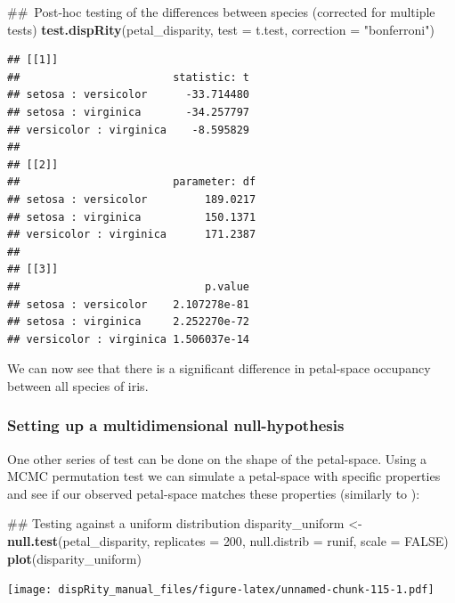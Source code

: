 \documentclass[]{book}
\newenvironment{Shaded}{\begin{snugshade}}{\end{snugshade}}
\newcommand{\KeywordTok}[1]{\textcolor[rgb]{0.13,0.29,0.53}{\textbf{#1}}}
\newcommand{\DataTypeTok}[1]{\textcolor[rgb]{0.13,0.29,0.53}{#1}}
\newcommand{\DecValTok}[1]{\textcolor[rgb]{0.00,0.00,0.81}{#1}}
\newcommand{\StringTok}[1]{\textcolor[rgb]{0.31,0.60,0.02}{#1}}
\newcommand{\OtherTok}[1]{\textcolor[rgb]{0.56,0.35,0.01}{#1}}
\newcommand{\NormalTok}[1]{#1}
\theoremstyle{definition}
\theoremstyle{definition}
\theoremstyle{remark}
\begin{document}
\begin{Shaded}
\begin{Highlighting}[]
\NormalTok{## Post-hoc testing of the differences between species (corrected for multiple tests)}
\KeywordTok{test.dispRity}\NormalTok{(petal_disparity, }\DataTypeTok{test =}\NormalTok{ t.test, }\DataTypeTok{correction =} \StringTok{"bonferroni"}\NormalTok{)}
\end{Highlighting}
\end{Shaded}

\begin{verbatim}
## [[1]]
##                        statistic: t
## setosa : versicolor      -33.714480
## setosa : virginica       -34.257797
## versicolor : virginica    -8.595829
## 
## [[2]]
##                        parameter: df
## setosa : versicolor         189.0217
## setosa : virginica          150.1371
## versicolor : virginica      171.2387
## 
## [[3]]
##                             p.value
## setosa : versicolor    2.107278e-81
## setosa : virginica     2.252270e-72
## versicolor : virginica 1.506037e-14
\end{verbatim}

We can now see that there is a significant difference in petal-space
occupancy between all species of iris.

\subsubsection{Setting up a multidimensional
null-hypothesis}\label{setting-up-a-multidimensional-null-hypothesis}

One other series of test can be done on the shape of the petal-space.
Using a MCMC permutation test we can simulate a petal-space with
specific properties and see if our observed petal-space matches these
properties (similarly to \citet{diaz2016global}):

\begin{Shaded}
\begin{Highlighting}[]
\NormalTok{## Testing against a uniform distribution}
\NormalTok{disparity_uniform <-}\StringTok{ }\KeywordTok{null.test}\NormalTok{(petal_disparity, }\DataTypeTok{replicates =} \DecValTok{200}\NormalTok{,}
    \DataTypeTok{null.distrib =}\NormalTok{ runif, }\DataTypeTok{scale =} \OtherTok{FALSE}\NormalTok{)}
\KeywordTok{plot}\NormalTok{(disparity_uniform)}
\end{Highlighting}
\end{Shaded}

\texttt{[image: dispRity\_manual\_files/figure-latex/unnamed-chunk-115-1.pdf]}
\end{document}
